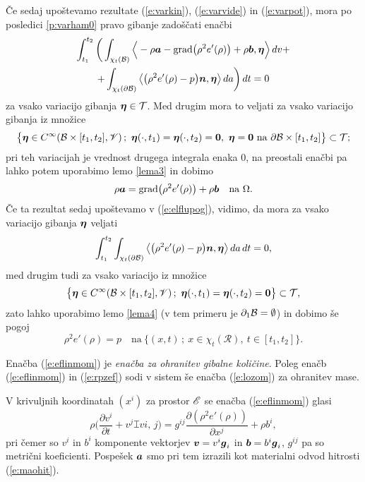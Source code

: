 Če sedaj upoštevamo rezultate (\ref{e:varkin}), (\ref{e:varvide}) in (\ref{e:varpot}),
mora po posledici \ref{p:varham0} pravo gibanje zadoščati enačbi
\begin{multline} \label{e:elflupog}
	\int_{t_1}^{t_2}\bigg( \int_{\chi_t(\mathcal B)}\Big<-\rho\boldsymbol a-
	\mathrm{grad}\big(\rho^2 e'(\rho)\big)+\rho\boldsymbol b,\boldsymbol \eta\Big>\,dv+ \\
	+\int_{\chi_t(\partial \mathcal B)}\big<\big(\rho^2 e'(\rho)-p\big)\boldsymbol n,\boldsymbol \eta\big>\,da\bigg)\,dt=0
\end{multline}
za vsako variacijo gibanja $\boldsymbol \eta\in\mathcal{T}$. Med drugim mora to veljati za
vsako variacijo gibanja iz množice
\[
	\big\{ \vek{\eta}\in C^{\infty}(\B\times[t_1,t_2],\V)\,;\ \vek{\eta}(\cdot,t_1)=
	\vek{\eta}(\cdot,t_2)=\vek{0},\ \vek{\eta}=\vek{0}\ \textrm{na}\ \partial \B\times[t_1,t_2]
	\big\}\subset\mathcal{T};
\]
pri teh variacijah je vrednost drugega integrala enaka 0, na preostali enačbi
pa lahko potem uporabimo lemo \ref{lema3} in dobimo
\begin{equation} \label{e:eflinmom}
	\rho\boldsymbol a=\mathrm{grad}\big(\rho^2 e'(\rho)\big)+\rho\boldsymbol b\quad
	\textrm{na}\ \Omega.
\end{equation}
Če ta rezultat sedaj upoštevamo v (\ref{e:elflupog}), vidimo, da mora
za vsako variacijo gibanja $\boldsymbol \eta$ veljati
\[
	\int_{t_1}^{t_2}\int_{\chi_t(\partial \mathcal B)}\big<\big(\rho^2 e'(\rho)-p\big)\boldsymbol n,\boldsymbol \eta\big>\,da\,dt=0,
\]
med drugim tudi za vsako variacijo iz množice
\[
	\big\{ \vek{\eta}\in C^{\infty}(\B\times[t_1,t_2],\V)\,;\ \vek{\eta}(\cdot,t_1)=
	\vek{\eta}(\cdot,t_2)=\vek{0} \big\}\subset\mathcal{T},
\]
zato lahko uporabimo lemo \ref{lema4} (v tem primeru je $\partial_1\mathcal B=\emptyset$) in dobimo še pogoj
\begin{equation} \label{e:rpzef}
	\rho^2 e'(\rho)=p \quad\textrm{na}\ \{ (x,t)\,;\ x\in\chi_t(\mathcal{R}),\ t\in[t_1,t_2] \}.
\end{equation}

Enačba (\ref{e:eflinmom}) je \emph{enačba za ohranitev gibalne količine}.
Poleg enačb (\ref{e:eflinmom}) in (\ref{e:rpzef}) sodi v sistem še enačba (\ref{e:lozom})
za ohranitev mase.

V krivuljnih koordinatah $(x^i)$ za prostor $\mathscr E$ se enačba (\ref{e:eflinmom}) glasi
\[
	\rho\Big(\frac{\partial v^i}{\partial t}+v^j \topbot{v}{i}{,\, j}\Big)
	=g^{ij}\frac{\partial (\rho^2e'(\rho))}{\partial x^j}+\rho b^i,
\]
pri čemer so $v^i$ in $b^i$ komponente vektorjev $\boldsymbol v=v^i\boldsymbol g_i$ in $\boldsymbol b=b^i\boldsymbol g_i$,
$g^{ij}$ pa so metrični koeficienti.
Pospešek $\boldsymbol a$ smo pri tem izrazili kot materialni odvod hitrosti (\ref{e:maohit}).



